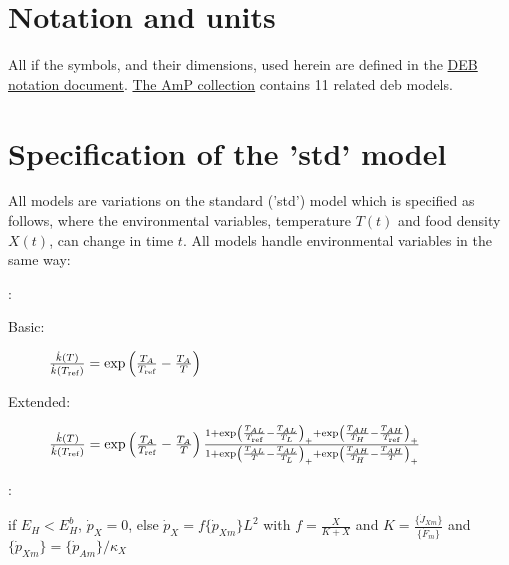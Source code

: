 
\section{Notation and units}

All if the symbols, and their dimensions, used herein are defined in the \href{https://www.bio.vu.nl/thb/deb/deblab/bib/Kooy2010_n.pdf}{DEB notation document}.
\href{https://www.bio.vu.nl/thb/deb/deblab/add_my_pet/about.html}{The AmP collection} contains  11 related {\sc deb} models.

\section{Specification of the 'std' model}



All models are variations on the standard ('std') model which is specified as follows, where
the environmental variables, temperature $T(t)$ and food density $X(t)$, can change in time $t$.
All models handle environmental variables in the same way:

\vspace{5mm}: {\small
\begin{description}
   \item[Basic: ]  $\frac{\dot{k}(T)} {\dot{k}(T_{\mbox{\tiny ref}})} =  
	    \exp \left( \frac{T_A} {T_{\mbox{\tiny ref}}} - \frac{T_A} {T} \right)$

   \item[Extended: ]  $\frac{\dot{k}(T)} {\dot{k}(T_{\mbox{\tiny ref}})} =  
	    \exp \left( \frac{T_A} {T_{\mbox{\tiny ref}}} - \frac{T_A} {T} \right) 
			\frac{1 + \exp\left(\frac{T_{AL}} {T_{\mbox{\tiny ref}}} - \frac{T_{AL}} {T_L}\right)_+ + 
			          \exp\left(\frac{T_{AH}} {T_H} - \frac{T_{AH}} {T_{\mbox{\tiny ref}}}\right)_+}
	         {1 + \exp \left( \frac{T_{AL}} {T} - \frac{T_{AL}} {T_L} \right)_+ + \exp \left(\frac{T_{AH}} {T_H} - \frac{T_{AH}} {T} \right)_+}$
\end{description}}

\vspace{5mm}: {\small
\begin{description}
  \item if $E_H < E_H^b$, $\dot{p}_X = 0$,  else $\dot{p}_X = f \{\dot{p}_{Xm}\} L^2$ with 
	   $f = \frac{X} {K + X}$ and $K = \frac{\{\dot{J}_{Xm}\}} {\{\dot{F}_m\}}$ and
		 $\{\dot{p}_{Xm}\} = \{\dot{p}_{Am}\}/ \kappa_X$
\end{description}}


